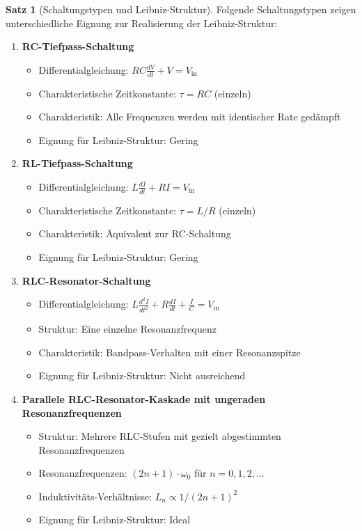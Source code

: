 \documentclass[a4paper, 12pt, twoside, openright]{report}
\theoremstyle{definition}
\theoremstyle{definition}
\newtheorem{satz}{Satz}[chapter]
\begin{document}
\begin{satz}[Schaltungstypen und Leibniz-Struktur]
Folgende Schaltungstypen zeigen unterschiedliche Eignung zur Realisierung der Leibniz-Struktur:

\begin{enumerate}
	\item \textbf{RC-Tiefpass-Schaltung}
		\begin{itemize}
			\item Differentialgleichung: $RC \frac{dV}{dt} + V = V_{\text{in}}$
			\item Charakteristische Zeitkonstante: $\tau = RC$ (einzeln)
			\item Charakteristik: Alle Frequenzen werden mit identischer Rate gedämpft
			\item Eignung für Leibniz-Struktur: Gering
		\end{itemize}
	
	\item \textbf{RL-Tiefpass-Schaltung}
		\begin{itemize}
			\item Differentialgleichung: $L \frac{dI}{dt} + RI = V_{\text{in}}$
			\item Charakteristische Zeitkonstante: $\tau = L/R$ (einzeln)
			\item Charakteristik: Äquivalent zur RC-Schaltung
			\item Eignung für Leibniz-Struktur: Gering
		\end{itemize}
	
	\item \textbf{RLC-Resonator-Schaltung}
		\begin{itemize}
			\item Differentialgleichung: $L \frac{d^2 I}{dt^2} + R \frac{dI}{dt} + \frac{I}{C} = V_{\text{in}}$
			\item Struktur: Eine einzelne Resonanzfrequenz
			\item Charakteristik: Bandpass-Verhalten mit einer Resonanzspitze
			\item Eignung für Leibniz-Struktur: Nicht ausreichend
		\end{itemize}
	
	\item \textbf{Parallele RLC-Resonator-Kaskade mit ungeraden Resonanzfrequenzen}
		\begin{itemize}
			\item Struktur: Mehrere RLC-Stufen mit gezielt abgestimmten Resonanzfrequenzen
			\item Resonanzfrequenzen: $(2n+1) \cdot \omega_0$ für $n = 0, 1, 2, \ldots$
			\item Induktivitäts-Verhältnisse: $L_n \propto 1/(2n+1)^2$
			\item Eignung für Leibniz-Struktur: Ideal
		\end{itemize}
\end{enumerate}
\end{satz}
\end{document}
